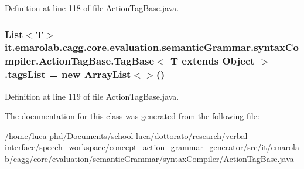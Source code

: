 Definition at line 118 of file Action\-Tag\-Base.\-java.

\hypertarget{classit_1_1emarolab_1_1cagg_1_1core_1_1evaluation_1_1semanticGrammar_1_1syntaxCompiler_1_1Action35425350c71420bf03866231192ab9e7_a6228a1283b999cee38ca7c84746442fe}{
\subsubsection[{tags\-List}]{\setlength{\rightskip}{0pt plus 5cm}List$<$T$>$ it.\-emarolab.\-cagg.\-core.\-evaluation.\-semantic\-Grammar.\-syntax\-Compiler.\-Action\-Tag\-Base.\-Tag\-Base$<$ T extends Object $>$.tags\-List = new Array\-List$<$$>$()\hspace{0.3cm}{\ttfamily [private]}}}\label{classit_1_1emarolab_1_1cagg_1_1core_1_1evaluation_1_1semanticGrammar_1_1syntaxCompiler_1_1Action35425350c71420bf03866231192ab9e7_a6228a1283b999cee38ca7c84746442fe}


Definition at line 119 of file Action\-Tag\-Base.\-java.



The documentation for this class was generated from the following file\-:\begin{DoxyCompactItemize}
\item 
/home/luca-\/phd/\-Documents/school luca/dottorato/research/verbal interface/speech\-\_\-workspace/concept\-\_\-action\-\_\-grammar\-\_\-generator/src/it/emarolab/cagg/core/evaluation/semantic\-Grammar/syntax\-Compiler/\hyperlink{ActionTagBase_8java}{Action\-Tag\-Base.\-java}\end{DoxyCompactItemize}
